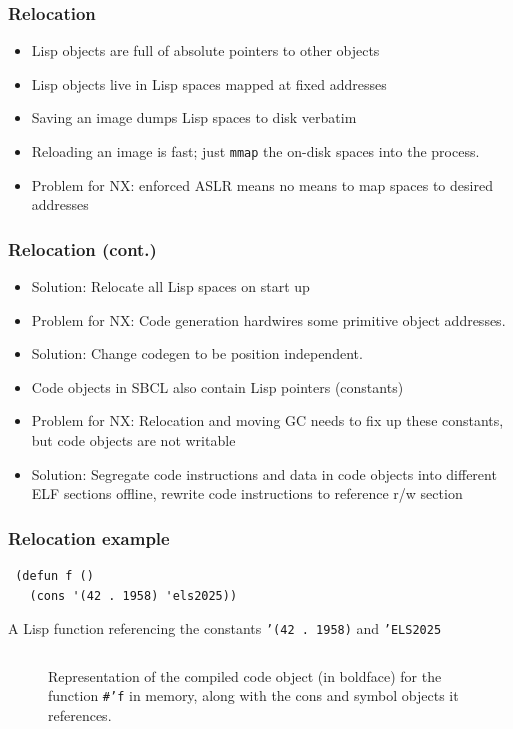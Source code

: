 \documentclass[14pt,t,aspectratio=169]{beamer}
\def\code#1{{\color{codecolor}\texttt{#1}}}
\begin{document}
\begin{frame}
  \frametitle{Relocation}
  \begin{itemize}
  \item Lisp objects are full of absolute pointers to other objects
  \item Lisp objects live in Lisp spaces mapped at fixed addresses
  \item Saving an image dumps Lisp spaces to disk verbatim
  \item Reloading an image is fast; just \texttt{mmap} the on-disk
    spaces into the process.
  \item \Rightarrow{} Problem for NX: enforced ASLR means no means to map spaces
    to desired addresses
  \end{itemize}
\end{frame}

\begin{frame}
  \frametitle{Relocation (cont.)}
  \begin{itemize}
    \item Solution: Relocate all Lisp spaces on start up
    \item \Rightarrow{} Problem for NX: Code generation hardwires some primitive
      object addresses.
    \item Solution: Change codegen to be position independent.
    \item Code objects in SBCL also contain Lisp pointers (constants)
    \item \Rightarrow{} Problem for NX: Relocation and moving GC needs to fix up
      these constants, but code objects are not writable
    \item Solution: Segregate code instructions and data in code
      objects into different ELF sections offline, rewrite code
      instructions to reference r/w section
  \end{itemize}
\end{frame}

\begin{frame}[fragile]
  \frametitle{Relocation example}
\begin{verbatim}
 (defun f ()
   (cons '(42 . 1958) 'els2025))
\end{verbatim}
  A Lisp function referencing the constants \code{'(42 . 1958)} and \code{'ELS2025}
\end{frame}

\begin{frame}
  \begin{figure}
    \begin{columns}
      \vspace{-2em}
      \phantom{123}
      
      Representation of the compiled code object (in boldface)
      for the function \protect\texttt{\#'f} in memory, along with the
      cons and symbol objects it references.
    \end{columns}
  \end{figure}
\end{frame}
\end{document}
